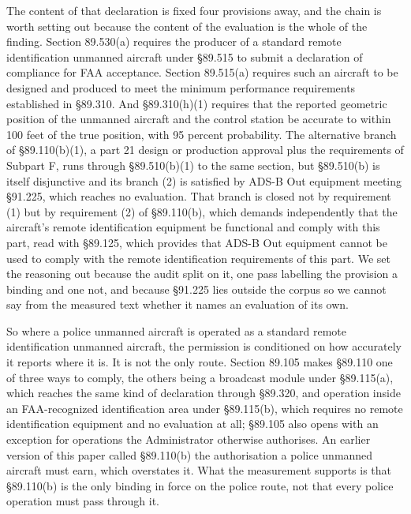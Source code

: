 The content of that declaration is fixed four provisions away, and the chain is worth setting out because the content of the evaluation is the whole of the finding. Section 89.530(a) requires the producer of a standard remote identification unmanned aircraft under \S{}89.515 to submit a declaration of compliance for FAA acceptance. Section 89.515(a) requires such an aircraft to be designed and produced to meet the minimum performance requirements established in \S{}89.310. And \S{}89.310(h)(1) requires that the reported geometric position of the unmanned aircraft and the control station be accurate to within 100 feet of the true position, with 95 percent probability. The alternative branch of \S{}89.110(b)(1), a part 21 design or production approval plus the requirements of Subpart F, runs through \S{}89.510(b)(1) to the same section, but \S{}89.510(b) is itself disjunctive and its branch (2) is satisfied by ADS-B Out equipment meeting \S{}91.225, which reaches no evaluation. That branch is closed not by requirement (1) but by requirement (2) of \S{}89.110(b), which demands independently that the aircraft's remote identification equipment be functional and comply with this part, read with \S{}89.125, which provides that ADS-B Out equipment cannot be used to comply with the remote identification requirements of this part. We set the reasoning out because the audit split on it, one pass labelling the provision a binding and one not, and because \S{}91.225 lies outside the corpus so we cannot say from the measured text whether it names an evaluation of its own.

So where a police unmanned aircraft is operated as a standard remote identification unmanned aircraft, the permission is conditioned on how accurately it reports where it is. It is not the only route. Section 89.105 makes \S{}89.110 one of three ways to comply, the others being a broadcast module under \S{}89.115(a), which reaches the same kind of declaration through \S{}89.320, and operation inside an FAA-recognized identification area under \S{}89.115(b), which requires no remote identification equipment and no evaluation at all; \S{}89.105 also opens with an exception for operations the Administrator otherwise authorises. An earlier version of this paper called \S{}89.110(b) the authorisation a police unmanned aircraft must earn, which overstates it. What the measurement supports is that \S{}89.110(b) is the only binding in force on the police route, not that every police operation must pass through it.

